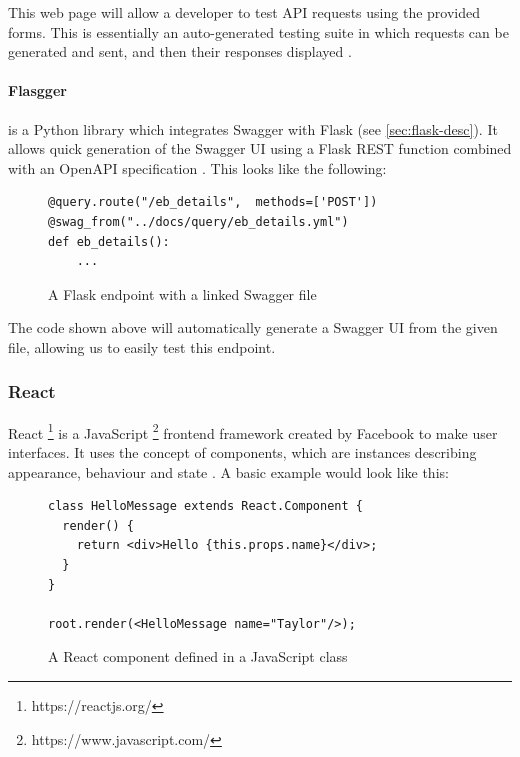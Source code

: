 \documentclass[12pt, letterpaper]{article}
\begin{document}
\begin{flushleft}
This web page will allow a developer to test API requests using the provided forms. This is essentially an auto-generated testing suite in which requests can be generated and sent, and then their responses displayed \cite{swagger-ui}.
\end{flushleft}

\paragraph{Flasgger} is a Python library which integrates Swagger with Flask (see \ref{sec:flask-desc}). It allows quick generation of the Swagger UI using a Flask REST function combined with an OpenAPI specification \cite{flasgger-desc}. This looks like the following:

\begin{flushleft}
\begin{figure}[H]
\begin{verbatim}
@query.route("/eb_details",  methods=['POST'])
@swag_from("../docs/query/eb_details.yml")
def eb_details():
	...
\end{verbatim}
\caption{A Flask endpoint with a linked Swagger file}
\end{figure}
\end{flushleft}

The code shown above will automatically generate a Swagger UI from the given file, allowing us to easily test this endpoint.

\subsubsection{React}\label{sec:react-desc}
React
\footnote{https://reactjs.org/}
is a JavaScript
\footnote{https://www.javascript.com/}
frontend framework created by Facebook to make user interfaces. It uses the concept of components, which are instances describing appearance, behaviour and state \cite{react-desc}. A basic example would look like this:

\begin{flushleft}
\begin{figure}[H]
\begin{verbatim}
class HelloMessage extends React.Component {
  render() {
    return <div>Hello {this.props.name}</div>;
  }
}

root.render(<HelloMessage name="Taylor"/>);
\end{verbatim}
\caption{A React component defined in a JavaScript class \cite{react-desc}}
\end{figure}
\end{flushleft}
\end{document}

